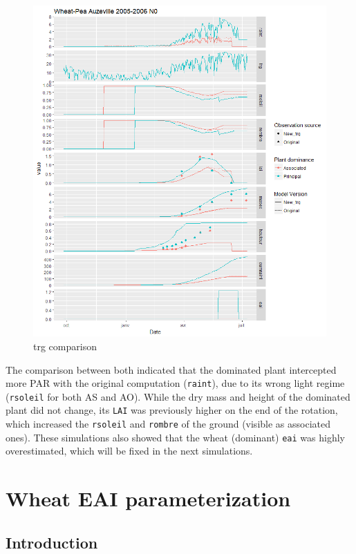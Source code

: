\documentclass[]{book}
\theoremstyle{definition}
\theoremstyle{definition}
\theoremstyle{definition}
\theoremstyle{remark}
\begin{document}
\begin{figure}
\centering
\includegraphics{img/trg-computation.png}
\caption{\label{fig:trgcomparison1}trg comparison}
\end{figure}

The comparison between both indicated that the dominated plant
intercepted more PAR with the original computation (\texttt{raint}), due
to its wrong light regime (\texttt{rsoleil} for both AS and AO). While
the dry mass and height of the dominated plant did not change, its
\texttt{LAI} was previously higher on the end of the rotation, which
increased the \texttt{rsoleil} and \texttt{rombre} of the ground
(visible as associated ones). These simulations also showed that the
wheat (dominant) \texttt{eai} was highly overestimated, which will be
fixed in the next simulations.

\chapter{Wheat EAI parameterization}\label{eai}

\section{Introduction}\label{introduction-1}
\end{document}
